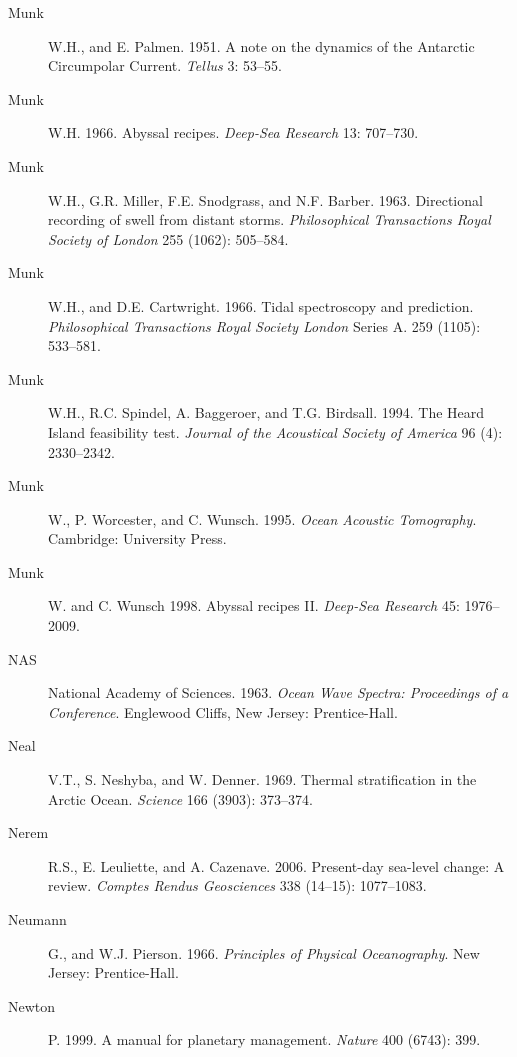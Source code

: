 \begin{description}
\item [Munk]W.H., and E. Palmen. 1951. A note on the dynamics of the
  Antarctic Circumpolar Current. \textit{Tellus} 3: 53--55.

\item [Munk]W.H. 1966. Abyssal recipes. \textit{Deep-Sea Research} 13:
  707--730.

\item [Munk]W.H., G.R. Miller, F.E. Snodgrass, and N.F. Barber. 1963.
  Directional recording of swell from distant
  storms. \textit{Philosophical Transactions Royal Society of London}
  255 (1062): 505--584.

\item [Munk]W.H., and D.E. Cartwright. 1966. Tidal spectroscopy and
  prediction.  \textit{Philosophical Transactions Royal Society
    London} Series A. 259 (1105): 533--581.

\item [Munk]W.H., R.C. Spindel, A. Baggeroer, and
  T.G. Birdsall. 1994. The Heard Island feasibility
  test. \textit{Journal of the Acoustical Society of America} 96 (4):
  2330--2342.

\item [Munk]W., P. Worcester, and C. Wunsch. 1995. \textit{Ocean
  Acoustic Tomography}.  Cambridge: University Press.

\item [Munk]W. and C. Wunsch 1998. Abyssal recipes
  II. \textit{Deep-Sea Research} 45: 1976--2009.

\item [NAS]National Academy of Sciences. 1963. \textit{Ocean Wave
  Spectra: Proceedings of a Conference}.  Englewood Cliffs, New
  Jersey: Prentice-Hall.

\item [Neal]V.T., S. Neshyba, and W. Denner. 1969. Thermal
  stratification in the Arctic Ocean. \textit{Science} 166 (3903):
  373--374.

\item[Nerem]R.S., E. Leuliette, and A. Cazenave. 2006. Present-day
  sea-level change: A review. \textit{Comptes Rendus Geosciences} 338
  (14--15): 1077--1083.

\item [Neumann]G., and W.J. Pierson.  1966. \textit{Principles of
  Physical Oceanography}.  New Jersey: Prentice-Hall.

\item [Newton]P. 1999. A manual for planetary
  management. \textit{Nature} 400 (6743): 399.


\end{description}
